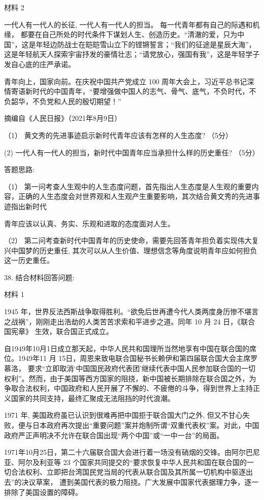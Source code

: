 \documentclass[UTF8,11pt]{ctexart}
\begin{document}
材料 2

一代人有一代人的长征, 一代人有一代人的担当。 每一代青年都有自己的际遇和机缘， 都要在自己所处的时代条件下谋划人生、创造历史。“清澈的爱，只为中国”，这是年轻边防战士在皑皑雪山立下的铿锵誓言；“我们的征途是星辰大海”，这是年轻航天人探索宇宙抒发的豪情壮志；“请党放心，强国有我”，这是年轻学子发自心底的庄严承诺。

青年向上，国家向前。在庆祝中国共产党成立 100 周年大会上，习近平总书记深情寄语新时代的中国青年，“要增强做中国人的志气、骨气、底气，不负时代，不负韶华，不负党和人民的殷切期望！”

摘编自《人民日报》（2021年8月9日）

（1） 黄文秀的先进事迹启示新时代青年应该有怎样的人生态度? （5分）

(2) 一代人有一代人的担当，新时代中国青年应当承担什么样的历史重任? （5分）

答题思路:

（1） 第一问考查人生观中的人生态度问题，首先指出人生态度是人生观的重要内容，正确的人生态度会对世界观和人生观产生重要影响，其次结合黄文秀的先进事迹指出新时代

青年应该以认真、务实、乐观和进取的态度面对人生。

（2） 第二问考查新时代中国青年的历史使命，需要先回答青年担负着实现伟大复兴中国梦的历史重任, 其次可以从人生价值、理想信念等角度说明青年应如何担负这一历史重任。

38. 结合材料回答问题:

材料 1

1945 年，世界反法西斯战争取得胜利。“欲免后世再遭今代人类两度身历惨不堪言之战祸”，刚刚走出浩劫的人类苦苦求索和平进步之道。同年 10 月 24 日，《联合国宪章》 生效，联合国正式成立。

自1949年10月1日成立那天起，中华人民共和国理所当然地享有中国在联合国的席位。1949年11 月 15日，周恩来致电联合国秘书长赖伊和第四届联合国大会主席罗慕洛， 要求“立即取消‘中国国民政府代表团’继续代表中国人民参加联合国的一切权利”。然而，由于美国等西方国家的阻挠，新中国被长期排除在联合国之外，为争取合法权利，中国政府和人民开展了不懈的、不疲倦的斗争，得到世界上主持正义国家的共同支持，最终汇聚成无法阻挡的时代浪潮。

1971 年, 美国政府虽已认识到很难再把中国拒于联合国大门之外, 但又不甘心失败，便与日本政府再次提出“重要问题”案并炮制所谓“双重代表权”案。对此，中国政府严正声明决不允许在联合国出现“两个中国”或“一中一台”的局面。

1971年10月25日，第二十六届联合国大会进行着一场没有硝烟的交锋。由阿尔巴尼亚、阿尔及利亚等 23 个国家共同提交的“要求恢复中华人民共和国在联合国的一切合法权利、立即把台湾国民党当局的代表从联合国及其所属一切机构中驱逐出去”的决议草案， 遭到美国代表的极力阻挠。广大发展中国家代表据理力争，逐一排除了美国设置的障碍。
\end{document}
